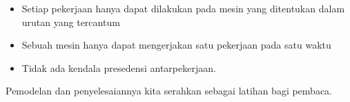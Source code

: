 \begin{itemize}
    \item Setiap pekerjaan hanya dapat dilakukan pada mesin yang ditentukan dalam urutan yang tercantum
    \item Sebuah mesin hanya dapat mengerjakan satu pekerjaan pada satu waktu
    \item Tidak ada kendala presedensi antarpekerjaan.
\end{itemize}
%

Pemodelan dan penyelesaiannya kita serahkan sebagai latihan bagi pembaca.


\iffalse  %
